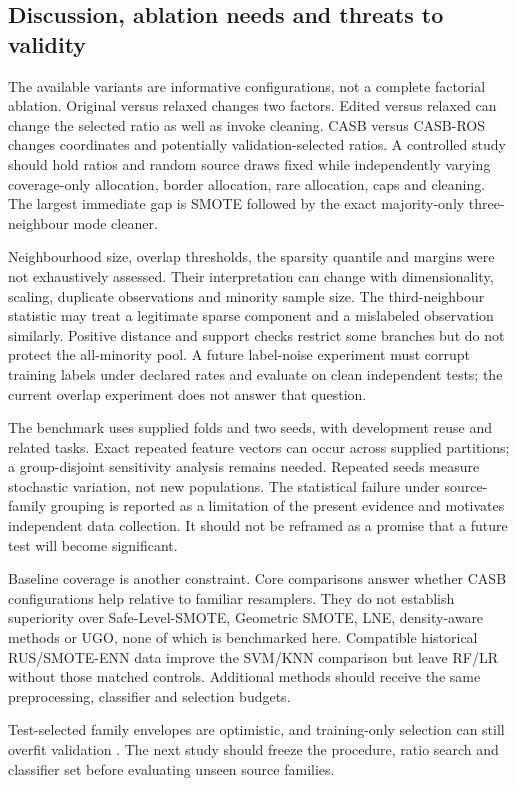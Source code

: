 \documentclass[conference]{IEEEtran}
\begin{document}
\clearpage
\balance
\subsection{Discussion, ablation needs and threats to validity}
The available variants are informative configurations, not a complete factorial ablation. Original versus relaxed changes two factors. Edited versus relaxed can change the selected ratio as well as invoke cleaning. CASB versus CASB-ROS changes coordinates and potentially validation-selected ratios. A controlled study should hold ratios and random source draws fixed while independently varying coverage-only allocation, border allocation, rare allocation, caps and cleaning. The largest immediate gap is SMOTE followed by the exact majority-only three-neighbour mode cleaner.

Neighbourhood size, overlap thresholds, the sparsity quantile and margins were not exhaustively assessed. Their interpretation can change with dimensionality, scaling, duplicate observations and minority sample size. The third-neighbour statistic may treat a legitimate sparse component and a mislabeled observation similarly. Positive distance and support checks restrict some branches but do not protect the all-minority pool. A future label-noise experiment must corrupt training labels under declared rates and evaluate on clean independent tests; the current overlap experiment does not answer that question.

The benchmark uses supplied folds and two seeds, with development reuse and related tasks. Exact repeated feature vectors can occur across supplied partitions; a group-disjoint sensitivity analysis remains needed. Repeated seeds measure stochastic variation, not new populations. The statistical failure under source-family grouping is reported as a limitation of the present evidence and motivates independent data collection. It should not be reframed as a promise that a future test will become significant.

Baseline coverage is another constraint. Core comparisons answer whether CASB configurations help relative to familiar resamplers. They do not establish superiority over Safe-Level-SMOTE, Geometric SMOTE, LNE, density-aware methods or UGO, none of which is benchmarked here. Compatible historical RUS/SMOTE-ENN data improve the SVM/KNN comparison but leave RF/LR without those matched controls. Additional methods should receive the same preprocessing, classifier and selection budgets.

Test-selected family envelopes are optimistic, and training-only selection can still overfit validation \citep{cawley2010}. The next study should freeze the procedure, ratio search and classifier set before evaluating unseen source families.
\end{document}
